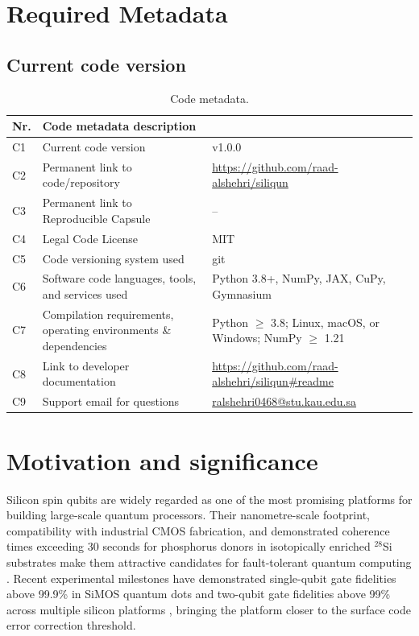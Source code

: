 \documentclass[preprint,12pt, a4paper]{elsarticle}
\begin{document}
\section*{Required Metadata}
\label{metadata}

\subsection*{Current code version}

\begin{table}[!h]
\begin{tabular}{|l|p{6.5cm}|p{6.5cm}|}
\hline
\textbf{Nr.} & \textbf{Code metadata description} & \textbf{} \\
\hline
C1 & Current code version & v1.0.0 \\
\hline
C2 & Permanent link to code/repository & \url{https://github.com/raad-alshehri/siliqun} \\
\hline
C3  & Permanent link to Reproducible Capsule & -- \\
\hline
C4 & Legal Code License & MIT \\
\hline
C5 & Code versioning system used & git \\
\hline
C6 & Software code languages, tools, and services used & Python 3.8+, NumPy, JAX, CuPy, Gymnasium \\
\hline
C7 & Compilation requirements, operating environments \& dependencies & Python $\geq$ 3.8; Linux, macOS, or Windows; NumPy $\geq$ 1.21 \\
\hline
C8 & Link to developer documentation & \url{https://github.com/raad-alshehri/siliqun\#readme} \\
\hline
C9 & Support email for questions & \href{mailto:ralshehri0468@stu.kau.edu.sa}{ralshehri0468@stu.kau.edu.sa} \\
\hline
\end{tabular}
\caption{Code metadata.}
\label{tab:codeMetadata} 
\end{table}

\section{Motivation and significance}
\label{sec:motivation}

Silicon spin qubits are widely regarded as one of the most promising platforms for building large-scale quantum processors. Their nanometre-scale footprint, compatibility with industrial CMOS fabrication, and demonstrated coherence times exceeding 30 seconds for phosphorus donors in isotopically enriched $^{28}$Si substrates make them attractive candidates for fault-tolerant quantum computing \cite{zwanenburg2013silicon, muhonen2014storing}. Recent experimental milestones have demonstrated single-qubit gate fidelities above 99.9\% in SiMOS quantum dots \cite{yoneda2018quantum} and two-qubit gate fidelities above 99\% across multiple silicon platforms \cite{noiri2022fast, xue2022quantum, mills2022two, madzik2022precision}, bringing the platform closer to the surface code error correction threshold.
\end{document}
